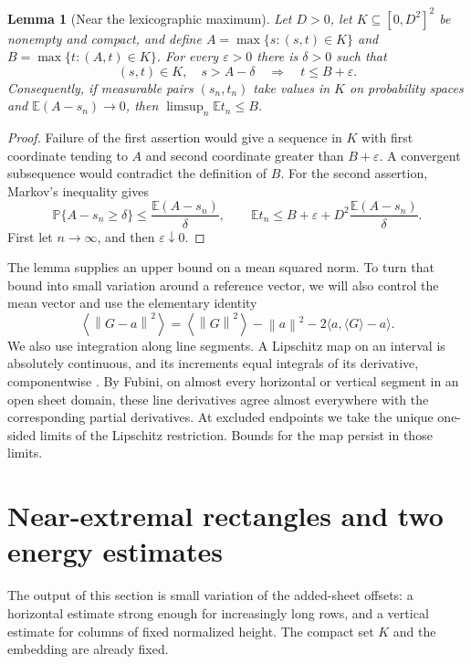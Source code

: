\documentclass[11pt]{article}
\newtheorem{lemma}[theorem]{Lemma}
\newcommand{\norm}[1]{\left\lVert#1\right\rVert}
\newcommand{\inner}[2]{\langle #1,#2\rangle}
\begin{document}
\begin{lemma}[Near the lexicographic maximum]\label{lem:compact}
Let $D>0$, let $K\subseteq[0,D^2]^2$ be nonempty and compact, and define
$A=\max\{s:(s,t)\in K\}$ and $B=\max\{t:(A,t)\in K\}$.
For every $\varepsilon>0$ there is $\delta>0$ such that
\[
 (s,t)\in K,\quad s>A-\delta\quad\Longrightarrow\quad t\le B+\varepsilon.
\]
Consequently, if measurable pairs $(s_n,t_n)$ take values in $K$ on probability spaces and $\mathbb E(A-s_n)\to0$, then
$\limsup_n\mathbb E t_n\le B$.
\end{lemma}
\begin{proof}
Failure of the first assertion would give a sequence in $K$ with first coordinate tending to $A$ and second coordinate greater than $B+\varepsilon$. A convergent subsequence would contradict the definition of $B$. For the second assertion, Markov's inequality gives
\[
 \mathbb P\{A-s_n\ge\delta\}\le\frac{\mathbb E(A-s_n)}{\delta},
 \qquad
 \mathbb E t_n\le B+\varepsilon+
 D^2\frac{\mathbb E(A-s_n)}{\delta}.
\]
First let $n\to\infty$, and then $\varepsilon\downarrow0$.
\end{proof}

The lemma supplies an upper bound on a mean squared norm. To turn that bound into small variation around a reference vector, we will also control the mean vector and use the elementary identity
\begin{equation}\label{eq:variance}
 \left\langle\norm{G-a}^2\right\rangle
 =\left\langle\norm{G}^2\right\rangle-\norm a^2
       -2\inner{a}{\langle G\rangle-a}.
\end{equation}
We also use integration along line segments. A Lipschitz map on an interval is absolutely continuous, and its increments equal integrals of its derivative, componentwise \cite[Theorem 3.3]{Heinonen}. By Fubini, on almost every horizontal or vertical segment in an open sheet domain, these line derivatives agree almost everywhere with the corresponding partial derivatives. At excluded endpoints we take the unique one-sided limits of the Lipschitz restriction. Bounds for the map persist in those limits.

\section{Near-extremal rectangles and two energy estimates}
\label{sec:energy}
The output of this section is small variation of the added-sheet offsets: a horizontal estimate strong enough for increasingly long rows, and a vertical estimate for columns of fixed normalized height. The compact set $K$ and the embedding are already fixed.
\end{document}
